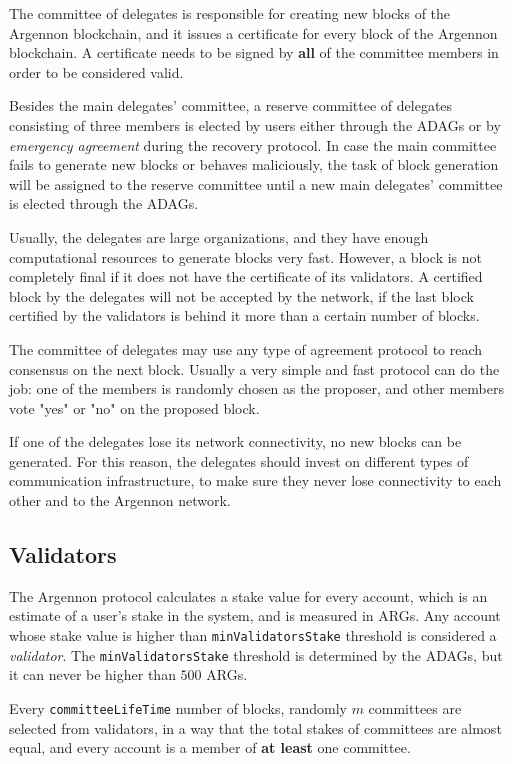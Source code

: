 The committee of delegates is responsible for creating new blocks of the Argennon blockchain, and it issues a
certificate for every block of the Argennon blockchain. A certificate needs to be signed
by \textbf{all} of the committee members in order to be considered valid.

Besides the main delegates' committee, a reserve committee of delegates consisting of three members is elected by users
either through the ADAGs or by \emph{emergency agreement} during the recovery protocol. In case the main committee
fails to generate new blocks or behaves maliciously, the task of
block generation will be assigned to the reserve committee until a new main delegates' committee is elected
through the ADAGs.

Usually, the delegates are large organizations, and they have enough computational resources to generate blocks
very fast. However, a block is not completely final if it does not have the certificate of its validators.
A certified block by the delegates will not be accepted by the network, if the last block certified by
the validators is behind it more than a certain number of blocks.

The committee of delegates may use any type of agreement protocol to reach consensus on the
next block. Usually a very simple and fast protocol can do the job: one of the members
is randomly chosen as the proposer, and other members vote "yes" or "no" on the proposed block.

If one of the delegates lose its network connectivity, no new blocks can be generated. For this reason,
the delegates should invest on different types of communication infrastructure, to make sure they never lose
connectivity to each other and to the Argennon network.

\subsection{Validators}\label{subsec:validators-committee}

The Argennon protocol calculates a stake value for every account, which is an estimate of a user's stake in the
system, and is measured in ARGs. Any account whose stake value is higher than
\texttt{minValidatorsStake} threshold is considered a \emph{validator}.
The \texttt{minValidatorsStake}
threshold is determined by the ADAGs, but it can never be higher than $500$ ARGs.

Every \texttt{committeeLifeTime} number of blocks, randomly $m$ committees are selected from
validators, in a way that the total stakes of committees are almost equal, and every
account is a member of \textbf{at least} one committee.

